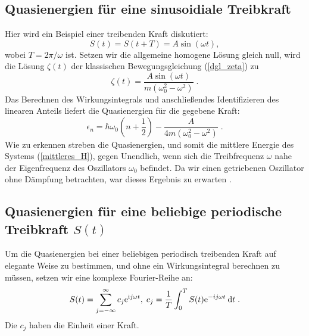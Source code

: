       \subsection{Quasienergien für eine sinusoidiale Treibkraft}
      \label{epsilon_sinuskraft}
        Hier wird ein Beispiel einer treibenden Kraft diskutiert: %
        \begin{equation}
          S(t) = S(t+T) = A\sin(\omega t),
        \end{equation}
        wobei $T=2\pi / \omega$ ist.
        Setzen wir die allgemeine homogene Lösung gleich null, wird die Lösung $\zeta(t)$ der klassischen Bewegungsgleichung (\ref{dgl_zeta}) zu \cite{mads}
        \begin{equation}
          \zeta(t) = \frac{A\sin(\omega t)}{m(\omega_0^2 - \omega^2)} \;
          \label{zeta_sinuskraft}.
        \end{equation}
        Das Berechnen des Wirkungsintegrals und anschließendes Identifizieren des linearen Anteils liefert die Quasienergien für die gegebene Kraft:
        \begin{equation}
          \epsilon_n  = \hbar \omega_0\left(n+\frac{1}{2}\right) - \frac{A}{4m(\omega_0^2-\omega^2)} \;.
        \end{equation}
        Wie zu erkennen streben die Quasienergien, und somit die mittlere Energie des Systems (\ref{mittleres_H}), gegen Unendlich, wenn sich die Treibfrequenz $\omega$ nahe der Eigenfrequenz des Oszillators $\omega_0 $ befindet.
        Da wir einen getriebenen Oszillator ohne Dämpfung betrachten, war dieses Ergebnis zu erwarten \cite{mads}.


    \subsection{Quasienergien für eine beliebige periodische Treibkraft $S(t)$}
      \label{epsilon_bel_kraft}
      Um die Quasienergien bei einer beliebigen periodisch treibenden Kraft auf elegante Weise zu bestimmen, und ohne ein Wirkungsintegral berechnen zu müssen, setzen wir eine komplexe Fourier-Reihe an:
      \begin{equation}
        S(t) = \sum_{j=-\infty}^\infty c_j \text e^{\text ij\omega t}, \; c_j = \frac{1}{T} \int_0^T S(t) \text e^{-ij\omega t} \: \text d t \; .
      \end{equation}
      Die $c_j$ haben die Einheit einer Kraft.

